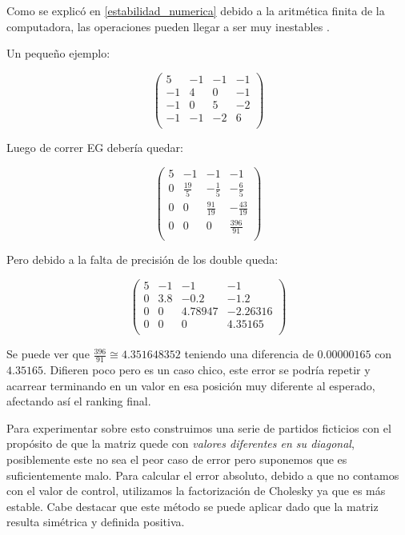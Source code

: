 Como se explicó en \ref{estabilidad_numerica} debido a la aritmética finita de la computadora,
las operaciones pueden llegar a ser muy inestables \cite{arithmetic}.

Un pequeño ejemplo:

$$\begin{pmatrix}
    5 & -1 & -1 & -1 \\
    -1 & 4 & 0 & -1 \\
    -1 & 0 & 5 & -2 \\
    -1 & -1 & -2 & 6 \\
\end{pmatrix}$$

Luego de correr EG debería quedar:

$$\begin{pmatrix}
    5 & -1 & -1 & -1 \\
    0 & \frac{19}{5} & -\frac{1}{5} & -\frac{6}{5} \\
    0 & 0 & \frac{91}{19} & -\frac{43}{19} \\
    0 & 0 & 0 & \frac{396}{91} \\
\end{pmatrix}$$

Pero debido a la falta de precisión de los double queda:

$$\begin{pmatrix}
    5 & -1 & -1 & -1 \\
    0 & 3.8 & -0.2 & -1.2 \\
    0 & 0 & 4.78947 & -2.26316 \\
    0 & 0 & 0 & 4.35165 \\
\end{pmatrix}$$

Se puede ver que $\frac{396}{91} \cong 4.351648352$ teniendo una diferencia de $0.00000165$ con $4.35165$.
Difieren poco pero es un caso chico, este error se podría repetir y acarrear terminando en un valor en esa posición muy diferente al esperado, afectando así el ranking final.

Para experimentar sobre esto construimos una serie de partidos ficticios con el propósito de que la matriz quede con \textit{valores diferentes en su diagonal}, posiblemente este no sea el peor caso de error pero suponemos que es suficientemente malo. Para calcular el error absoluto, debido a que no contamos con el valor de control, utilizamos la factorización de Cholesky ya que es más estable. Cabe destacar que este método se puede aplicar dado que la matriz resulta simétrica y definida positiva\cite{CMMpaper}.

